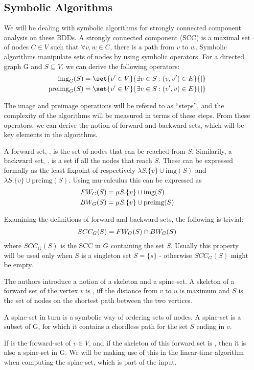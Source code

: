\documentclass[../master/master.tex]{subfiles}
\begin{document}
\subsection{Symbolic Algorithms}
We will be dealing with symbolic algorithms for strongly connected component analysis on these BDDs. A strongly connected component (SCC) is a maximal set of nodes $C\in V$ such that $\forall v,w\in C$, there is a path from $v$ to $w$. Symbolic algorithms manipulate sets of nodes by using symbolic operators. For a directed graph G and $S\subseteq V$, we can derive the following operators: 
\begin{align*}
\img S &= \set{v' \in V}{\exists v\in S:(v, v')\in E}{|}\\
\pre S &= \set{v' \in V}{\exists v\in S:(v', v)\in E}{|}
\end{align*}

The image and preimage operations will be refered to as ``steps'', and the complexity of the algorithms will be measured in terms of these steps. 
From these operators, we can derive the notion of forward and backward sets, which will be key elements in the algorithms.

A forward set, , is the set of nodes that can be reached from $S$. Similarily, a backward set, , is a set if all the nodes that reach $S$. These can be expressed formally as the least fixpoint of respectively $\lambda S.\{v\}\cup \text{img}(S)$ and $\lambda S.\{v\}\cup \text{preimg}(S)$. Using mu-calculus \cite{clarke_peled_grumberg_1999} this can be expressed as 
\begin{align}\label{fw}
FW_{G}(S) &= \mu S.\{v\}\cup \text{img}(S)\\
\label{bw}BW_{G}(S) &= \mu S.\{v\}\cup \text{preimg}(S)
\end{align}

\noindent Examining the definitions of forward and backward sets, the following is trivial:
\begin{align}
SCC_G(S) = FW_{G}(S) \cap BW_{G}(S) \label{scc}
\end{align}
where $SCC_G(S)$ is the SCC in $G$ containing the set $S$. Usually this property will be used only when $S$ is a singleton set $S=\{s\}$ - otherwise $SCC_G(S)$ might be empty.

The authors \cite{linear} introduce a notion of a skeleton and a spine-set. A skeleton of a forward set of the vertex $v$  is , iff the distance from $v$ to $u$ is maximum and $S$ is the set of nodes on the shortest path between the two vertices.

A spine-set in turn is a symbolic way of ordering sets of nodes. A spine-set is a subset  of G, for which it contains a chordless path for the set $S$ ending in $v$.

If  is the forward-set of $v \in V$, and if the skeleton of this forward set is , then it is also a spine-set in G. We will be making use of this in the linear-time algorithm when computing the spine-set, which is part of the input. 
\end{document}
